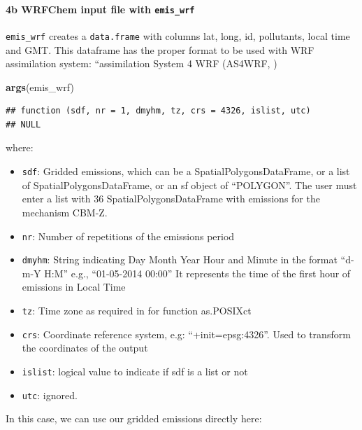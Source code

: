 \documentclass[12pt,graybox,envcountchap,sectrefs]{krantz}
\makeatletter
\newenvironment{Shaded}{\begin{snugshade}}{\end{snugshade}}
\newcommand{\KeywordTok}[1]{\textcolor[rgb]{0.13,0.29,0.53}{\textbf{#1}}}
\newcommand{\DataTypeTok}[1]{\textcolor[rgb]{0.13,0.29,0.53}{#1}}
\newcommand{\StringTok}[1]{\textcolor[rgb]{0.31,0.60,0.02}{#1}}
\newcommand{\OtherTok}[1]{\textcolor[rgb]{0.56,0.35,0.01}{#1}}
\newcommand{\OperatorTok}[1]{\textcolor[rgb]{0.81,0.36,0.00}{\textbf{#1}}}
\newcommand{\NormalTok}[1]{#1}
\providecommand{\tightlist}{%
  \setlength{\itemsep}{0pt}\setlength{\parskip}{0pt}}
\let\oldparagraph\paragraph
\renewcommand{\paragraph}[1]{\oldparagraph{#1}\mbox{}}
\newenvironment{kframe}{%
\medskip{}
\setlength{\fboxsep}{.8em}
 \def\at@end@of@kframe{}%
 \ifinner\ifhmode%
  \def\at@end@of@kframe{\end{minipage}}%
  \begin{minipage}{\columnwidth}%
 \fi\fi%
 \def\FrameCommand##1{\hskip\@totalleftmargin \hskip-\fboxsep
 \colorbox{shadecolor}{##1}\hskip-\fboxsep
     \hskip-\linewidth \hskip-\@totalleftmargin \hskip\columnwidth}%
 \MakeFramed {\advance\hsize-\width
   \@totalleftmargin\z@ \linewidth\hsize
   \@setminipage}}%
 {\par\unskip\endMakeFramed%
 \at@end@of@kframe}
\renewenvironment{Shaded}{\begin{kframe}}{\end{kframe}}
\theoremstyle{definition}
\theoremstyle{definition}
\theoremstyle{definition}
\theoremstyle{remark}
\makeatother
\begin{document}
\paragraph{\texorpdfstring{4b WRFChem input file with
\texttt{emis\_wrf}}{4b WRFChem input file with emis\_wrf}}\label{b-wrfchem-input-file-with-emis_wrf}

\texttt{emis\_wrf} creates a \texttt{data.frame} with columns lat, long,
id, pollutants, local time and GMT. This dataframe has the proper format
to be used with WRF assimilation system: ``assimilation System 4 WRF
(AS4WRF, \citet{angel})

\begin{Shaded}
\begin{Highlighting}[]
\KeywordTok{args}\NormalTok{(emis_wrf)}
\end{Highlighting}
\end{Shaded}

\begin{verbatim}
## function (sdf, nr = 1, dmyhm, tz, crs = 4326, islist, utc) 
## NULL
\end{verbatim}

where:

\begin{itemize}
\tightlist
\item
  \texttt{sdf}: Gridded emissions, which can be a
  SpatialPolygonsDataFrame, or a list of SpatialPolygonsDataFrame, or an
  sf object of ``POLYGON''. The user must enter a list with 36
  SpatialPolygonsDataFrame with emissions for the mechanism CBM-Z.
\item
  \texttt{nr}: Number of repetitions of the emissions period
\item
  \texttt{dmyhm}: String indicating Day Month Year Hour and Minute in
  the format ``d-m-Y H:M'' e.g., ``01-05-2014 00:00'' It represents the
  time of the first hour of emissions in Local Time
\item
  \texttt{tz}: Time zone as required in for function as.POSIXct
\item
  \texttt{crs}: Coordinate reference system, e.g: ``+init=epsg:4326''.
  Used to transform the coordinates of the output
\item
  \texttt{islist}: logical value to indicate if sdf is a list or not
\item
  \texttt{utc}: ignored.
\end{itemize}

In this case, we can use our gridded emissions directly here:

\begin{Shaded}
\end{Shaded}
\end{document}
